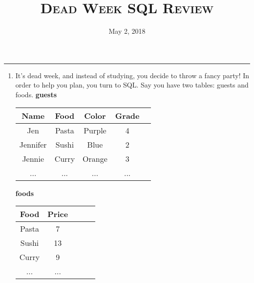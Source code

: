 \documentclass{exam}
\title{\textsc{Dead Week SQL Review}}
\date{May 2, 2018}
\begin{document}
\maketitle
\rule{\textwidth}{0.15em}
\fontsize{12}{15}\selectfont

\begin{enumerate}[1)]
\item It’s dead week, and instead of studying, you decide to throw a fancy party! In order to help you plan, you turn to SQL.
\newline 
Say you have two tables: guests and foods. 
\newline 
\textbf{guests}
\begin{center}
\begin{tabular}{|c|c|c|c|c|}
 \hline
 \textbf{Name} & \textbf{Food} & \textbf{Color} & \textbf{Grade} \\
 \hline
 Jen & Pasta & Purple & 4 \\
 \hline
 Jennifer & Sushi & Blue & 2 \\
 \hline
  Jennie & Curry & Orange & 3 \\
	\hline
	... & ... & ... & ...
 \hline
\end{tabular}
\end{center}
\textbf{foods}
\begin{center}
\begin{tabular}{|c|c|c|c|c|}
 \hline
 \textbf{Food} & \textbf{Price} \\
 \hline
 Pasta & 7\\
 \hline
 Sushi & 13 \\
 \hline
 Curry & 9 \\
 \hline
	... & ... 
 \hline
\end{tabular}
\end{center}


\end{enumerate}
\end{document}
